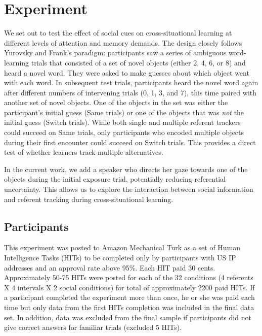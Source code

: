 \documentclass[man]{apa2}
\begin{document}


\section{Experiment}

We set out to test the effect of social cues on cross-situational learning at different levels of attention and memory demands. The design closely follows Yurovsky and Frank's paradigm: participants saw a series of ambiguous word-learning trials that consisted of a set of novel objects (either 2, 4, 6, or 8) and heard a novel word. They were asked to make guesses about which object went with each word. In subsequent test trials, participants heard the novel word again after different numbers of intervening trials (0, 1, 3, and 7), this time paired with another set of novel objects. One of the objects in the set was either the participant's initial guess (Same trials) or one of the objects that was \emph{not} the initial guess (Switch trials). While both single and multiple referent trackers could succeed on Same trials, only participants who encoded multiple objects during their first encounter could succeed on Switch trials. This provides a direct test of whether learners track multiple alternatives.

In the current work, we add a speaker who directs her gaze towards one of the objects during the initial exposure trial, potentially reducing referential uncertainty. This allows us to explore the interaction between social information and referent tracking during cross-situational learning. 

\subsection{Participants}

This experiment was posted to Amazon Mechanical Turk as a set of
Human Intelligence Tasks (HITs) to be completed only by participants with US IP
addresses and an approval rate above 95\%. Each HIT paid 30 cents. Approximately 50-75 HITs were posted for each of the 32 conditions (4 referents X 4 intervals X 2 social conditions) for total of approximately 2200 paid HITs. If a participant
completed the experiment more than once, he or she was paid each time but only data
from the first HITs completion was included in the final data set. In
addition, data was excluded from the final sample if participants did not give correct
answers for familiar trials (excluded 5 HITs).
\end{document}
